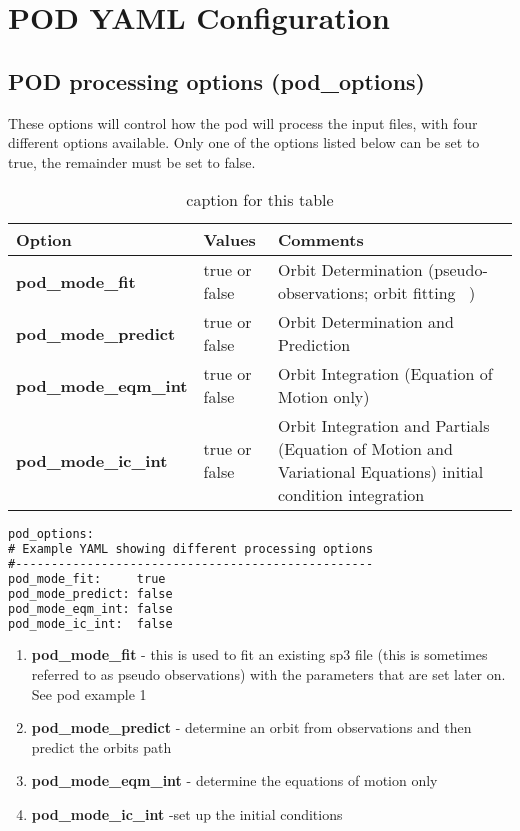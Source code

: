 \chapter{POD YAML Configuration}
\label{ch:pod_yaml_configuration}
\section{POD processing options (pod\_options)}
%

These options will control how the pod will process the input files, with four different options available. Only one of the options listed below can be set to true, the remainder must be set to false.\\
\begin{table}[h!]
\begin{tabular}{|p{4.5cm}|p{2cm}|p{3.5cm}|}
	\hline
    Option & Values & Comments \\
    \hline
	\textbf{pod\_mode\_fit} & true or false & Orbit Determination (pseudo-observations; orbit fitting \ ) \\
	\textbf{pod\_mode\_predict} & true or false & Orbit Determination and Prediction \\
	\textbf{pod\_mode\_eqm\_int} & true or false & Orbit Integration (Equation of Motion only) \\
	\textbf{pod\_mode\_ic\_int} & true or false & Orbit Integration and Partials (Equation of Motion and Variational Equations) initial condition integration \\
	\hline
\end{tabular}
\caption{caption for this table}
\label{table:label_name}
\end{table}
%
\begin{lstlisting}[language=xml,caption=pod\_options yaml configuration example]
pod_options:
# Example YAML showing different processing options
#--------------------------------------------------
pod_mode_fit:     true   
pod_mode_predict: false  
pod_mode_eqm_int: false  
pod_mode_ic_int:  false  
\end{lstlisting}
%
\begin{enumerate}
	\item \textbf{pod\_mode\_fit} - this is used to fit an existing sp3 file (this is sometimes referred to as pseudo observations) with the parameters that are set later on. See pod example 1
	\item \textbf{pod\_mode\_predict} - determine an orbit from observations and then predict the orbits path
	\item \textbf{pod\_mode\_eqm\_int} - determine the equations of motion only
	\item \textbf{pod\_mode\_ic\_int} -set up the initial conditions
\end{enumerate}

